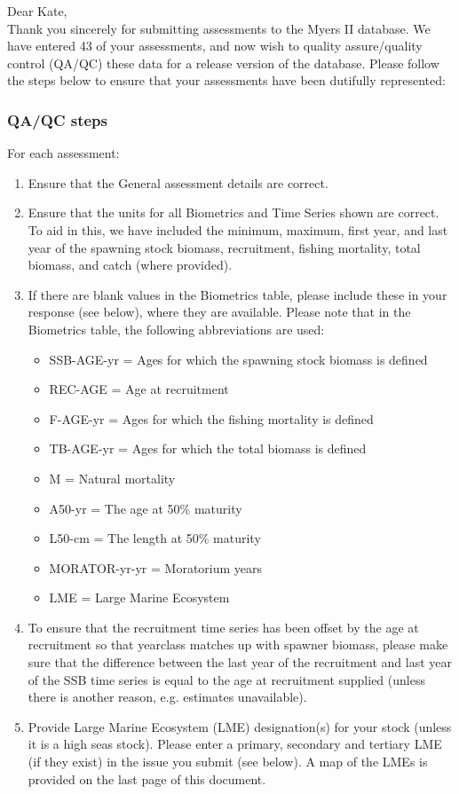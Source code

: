 \documentclass [a4paper, 10pt] {article}
\begin{document}
\noindent Dear Kate,\\

\noindent Thank you sincerely for submitting assessments to the Myers II database. We have entered 43 of your assessments, and now wish to quality assure/quality control (QA/QC) these data for a release version of the database. Please follow the steps below to ensure that your assessments have been dutifully represented:
\subsubsection{QA/QC steps}
For each assessment:
\begin{enumerate}
\item Ensure that the General assessment details are correct.
\item Ensure that the units for all Biometrics and Time Series shown are correct. To aid in this, we have included the minimum, maximum, first year, and last year of the spawning stock biomass, recruitment, fishing mortality, total biomass, and  catch  (where provided). 
\item If there are blank values in the Biometrics table, please include these in your response (see below), where they are available.
Please note that in the Biometrics table, the following abbreviations are used:
\begin{itemize}
\item SSB-AGE-yr  = Ages for which the spawning stock biomass is defined
\item REC-AGE     = Age at recruitment
\item F-AGE-yr    = Ages for which the fishing mortality is defined 
\item TB-AGE-yr   = Ages for which the total biomass is defined
\item M      = Natural mortality
\item A50-yr      = The age at 50\% maturity
\item L50-cm      = The length at 50\% maturity
\item MORATOR-yr-yr = Moratorium years
\item LME = Large Marine Ecosystem\\
\end{itemize}
\item To ensure that the recruitment time series has been offset by the age at recruitment so that yearclass matches up with spawner biomass, please make sure that the difference between the last year of the recruitment and last year of the SSB time series is equal to the age at recruitment supplied (unless there is another reason, e.g. estimates unavailable). 
\item Provide Large Marine Ecosystem (LME) designation(s) for your stock (unless it is a high seas stock). Please enter a primary, secondary and tertiary LME (if they exist) in the issue you submit (see below). A map of the LMEs is provided on the last page of this document. 
\end{enumerate}
\vspace{-.25in}
\end{document}
